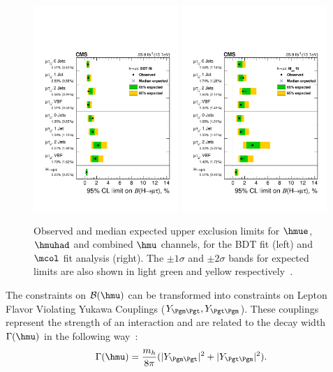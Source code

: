 \begin{figure}[!htpb]\centering
 \includegraphics[width=0.49\textwidth]{plots_and_figures/chapter8/h125/brazilflagBDT.pdf}
 \includegraphics[width=0.49\textwidth]{plots_and_figures/chapter8/h125/brazilflagmcol.pdf} \\
 \caption{Observed and median expected upper exclusion limits for $\hmue$, $\hmuhad$ and combined $\hmu$ channels, for the BDT fit (left) and $\mcol$ fit analysis (right). The $\pm 1 \sigma$ and $\pm 2 \sigma$ bands for expected limits are also shown in light green and yellow respectively~\cite{HIG-17-001}.}
 \label{fig:hmue_limits_brazil}
\end{figure}


The constraints on $\mathcal{B}(\hmu)$ can be transformed into constraints on Lepton Flavor Violating Yukawa Couplings ($Y_{\Pgm\Pgt},Y_{\Pgt\Pgm}$). These couplings represent the strength of an interaction and are related to the decay width $\Gamma(\hmu)$ in the following way~\cite{Harnik:2012pb}:
\begin{equation}                                                                                                                                                                                                 
\Gamma(\hmu)=\frac{m_{h}}{8\pi}(|Y_{\Pgm\Pgt}|^2 + |Y_{\Pgt\Pgm}|^2).                                                          
\label{eq:yuk1}
\end{equation}

